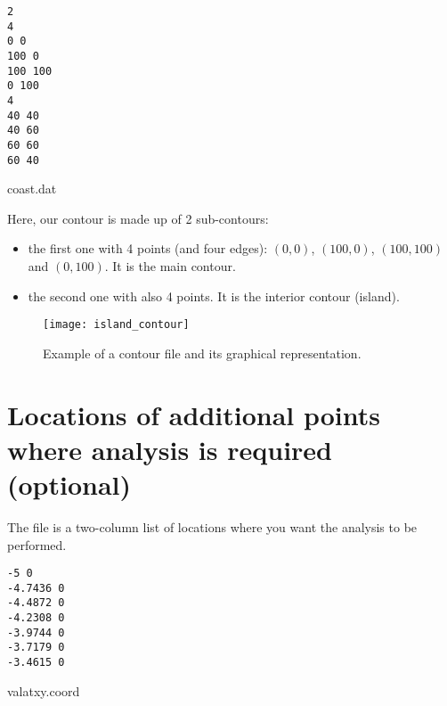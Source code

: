 \begin{exfile}[htpb]
\begin{footnotesize}
\texttt{2\\
4\\
0 0\\
100 0\\
100 100\\
0 100\\
4\\
40 40\\
40 60\\
60 60\\
60 40\\} 
\end{footnotesize}
\caption{coast.dat\label{ex:coast.dat}}
\end{exfile}

Here, our contour is made up of 2 sub-contours: 
\begin{itemize}
\item the first one with 4 points (and four edges): $(0,0)$, $(100,0)$, $(100,100)$ and $(0,100)$. It is the main contour.
\item the second one with also 4 points. It is the interior contour (island).
\end{itemize}

\begin{figure}[H]
\centering 
\texttt{[image: island\_contour]}
\caption{Example of a contour file and its graphical representation.}
\end{figure}



\section[Additional points of analysis]{Locations of additional points where analysis is required (optional)}

The file  is a two-column list of locations where you want the analysis to be performed.  

\begin{exfile}[htpb]
\begin{footnotesize}
\texttt{-5 0\\
-4.7436 0\\
-4.4872 0\\
-4.2308 0\\
-3.9744 0\\
-3.7179 0\\
-3.4615 0} 
\end{footnotesize}
\caption{valatxy.coord\label{ex:valatxy}}
\end{exfile}

